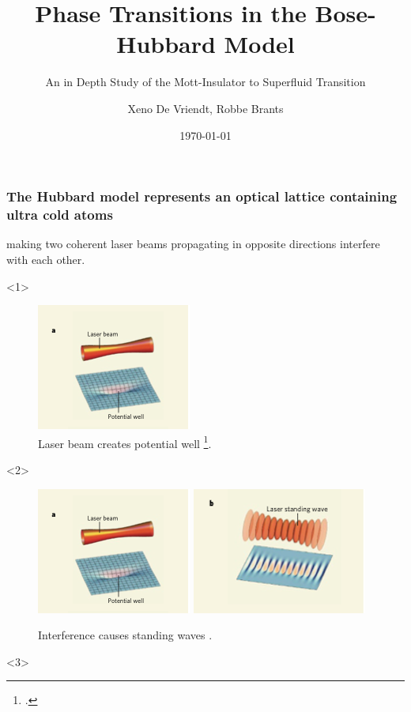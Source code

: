 \documentclass[aspectratio=169]{beamer}
\title{Phase Transitions in the Bose-Hubbard Model}
\subtitle{An in Depth Study of the Mott-Insulator to Superfluid Transition}
\author[DB]{Xeno De Vriendt, Robbe Brants}
\date{\today}
\begin{document}
\titleframe

\begin{frame}
  \frametitle{The Hubbard model represents an optical lattice containing ultra cold atoms}
  making two coherent laser beams propagating in opposite directions interfere with each other.
    \begin{onlyenv}<1>
      \begin{figure}
        \includegraphics[scale=0.5]{../img/Optical-lattice-creation-a.png}
        \caption{Laser beam creates potential well \footcite{Greiner2008}.}
      \end{figure}
    \end{onlyenv}
    \begin{onlyenv}<2>
      \begin{figure}
        \includegraphics[scale=0.5]{../img/Optical-lattice-creation-a.png} \includegraphics[scale=0.5]{../img/Optical-lattice-creation-b.png}
        \caption{Interference causes standing waves \footnotemark[1].}
      \end{figure} 
    \end{onlyenv}
    \begin{onlyenv}<3>
      \begin{figure}

\end{figure}
\end{onlyenv}
\end{frame}
\end{document}
